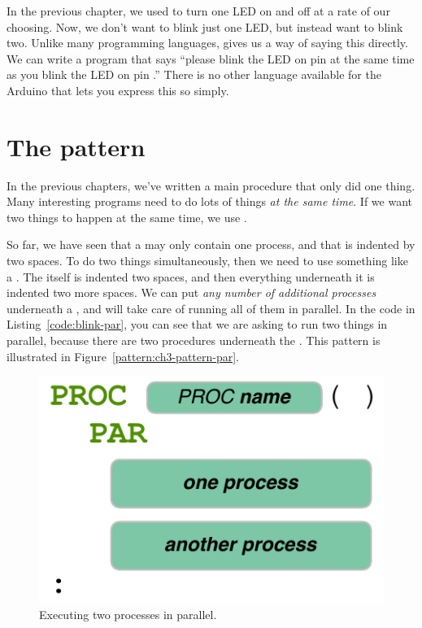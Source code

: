 In the previous chapter, we used \blink to turn one LED on and off at a rate of our choosing. Now, we don't want to blink just one LED, but instead want to blink two. Unlike many programming languages, \occam gives us a way of saying this directly. We can write a program that says ``please blink the LED on pin \pineleven at the same time as you blink the LED on pin \pintwelve.'' There is no other language available for the Arduino that lets you express this so simply.

\newpage

\CODE


\section{The \PAR pattern}

In the previous chapters, we've written a {\procname main} procedure that only did one thing. Many interesting programs need to do lots of things {\em at the same time}. If we want two things to happen at the same time, we use \PAR.

So far, we have seen that a \PROC may only contain one process, and that is indented by two spaces. To do two things simultaneously, then we need to use something like a \PAR. The \PAR itself is indented two spaces, and then everything underneath it is indented two more spaces. We can put {\em any number of additional processes} underneath a \PAR, and \occam will take care of running all of them in parallel. In the code in Listing~\vref{code:blink-par}, you can see that we are asking \plumbing to run two things in parallel, because there are two procedures underneath the \PAR. This pattern is illustrated in Figure~\vref{pattern:ch3-pattern-par}.

\begin{figure}[ht]
  \begin{center}
    \includegraphics[width=0.6\linewidth]{images/ch3-pattern-par}
    \caption{Executing two processes in parallel.}
    \label{pattern:ch3-pattern-par}
  \end{center}
\end{figure}

